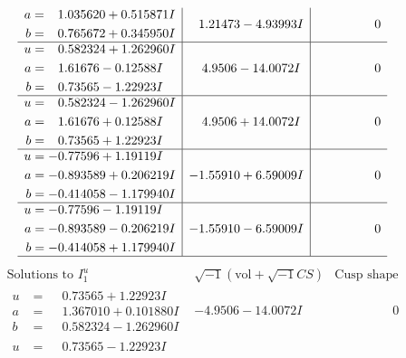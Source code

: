 \documentclass[1p]{elsarticle_modified}
\theoremstyle{definition}
\newcommand{\I}{\sqrt{-1}}
\begin{document}
$$\begin{array}{c|c|c}
\begin{aligned}
a &= \phantom{-}1.035620 + 0.515871 I \\
b &= \phantom{-}0.765672 + 0.345950 I\end{aligned}
 & \phantom{-}1.21473 - 4.93993 I & \phantom{-0.000000 } 0 \\ \hline\begin{aligned}
u &= \phantom{-}0.582324 + 1.262960 I \\
a &= \phantom{-}1.61676 - 0.12588 I \\
b &= \phantom{-}0.73565 - 1.22923 I\end{aligned}
 & \phantom{-}4.9506 - 14.0072 I & \phantom{-0.000000 } 0 \\ \hline\begin{aligned}
u &= \phantom{-}0.582324 - 1.262960 I \\
a &= \phantom{-}1.61676 + 0.12588 I \\
b &= \phantom{-}0.73565 + 1.22923 I\end{aligned}
 & \phantom{-}4.9506 + 14.0072 I & \phantom{-0.000000 } 0 \\ \hline\begin{aligned}
u &= -0.77596 + 1.19119 I \\
a &= -0.893589 + 0.206219 I \\
b &= -0.414058 - 1.179940 I\end{aligned}
 & -1.55910 + 6.59009 I & \phantom{-0.000000 } 0 \\ \hline\begin{aligned}
u &= -0.77596 - 1.19119 I \\
a &= -0.893589 - 0.206219 I \\
b &= -0.414058 + 1.179940 I\end{aligned}
 & -1.55910 - 6.59009 I & \phantom{-0.000000 } 0\\
 \hline 
 \end{array}$$\newpage$$\begin{array}{c|c|c}  
\text{Solutions to }I^u_{1}& \I (\text{vol} + \sqrt{-1}CS) & \text{Cusp shape}\\
 \hline 
\begin{aligned}
u &= \phantom{-}0.73565 + 1.22923 I \\
a &= \phantom{-}1.367010 + 0.101880 I \\
b &= \phantom{-}0.582324 - 1.262960 I\end{aligned}
 & -4.9506 - 14.0072 I & \phantom{-0.000000 } 0 \\ \hline\begin{aligned}
u &= \phantom{-}0.73565 - 1.22923 I \\

\end{aligned}
\end{array}$$
\end{document}
